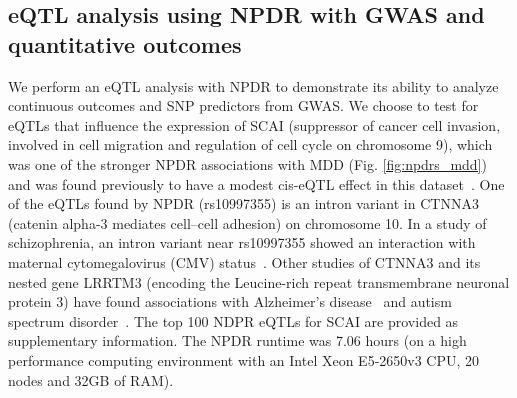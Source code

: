 \documentclass{bioinfo}
\begin{document}
\subsection{eQTL analysis using NPDR with GWAS and quantitative outcomes}

We perform an eQTL analysis with NPDR to demonstrate its ability to analyze continuous outcomes and SNP predictors from GWAS.
We choose to test for eQTLs that influence the expression of SCAI (suppressor of cancer cell invasion, involved in cell migration and regulation of cell cycle on chromosome 9), which was one of the stronger NPDR associations with MDD (Fig. \ref{fig:npdrs_mdd}) and was found previously to have a modest cis-eQTL effect in this dataset~\citep{mostafavi14}.
One of the eQTLs found by NPDR (rs10997355) is an intron variant in CTNNA3 (catenin alpha-3 mediates cell–cell adhesion) on chromosome 10.
In a study of schizophrenia, an intron variant near rs10997355 showed an interaction with maternal cytomegalovirus (CMV) status~\citep{borglum2014genome}.
Other studies of CTNNA3 and its nested gene LRRTM3 (encoding the Leucine-rich repeat transmembrane neuronal protein 3) have found associations with Alzheimer's disease~\citep{miyashita2007genetic} and autism spectrum disorder~\citep{wang2009common}.
The top 100 NDPR eQTLs for SCAI are provided as supplementary information.
The NPDR runtime was 7.06 hours (on a high performance computing environment with an Intel Xeon E5-2650v3 CPU, 20 nodes and 32GB of RAM).
\end{document}
